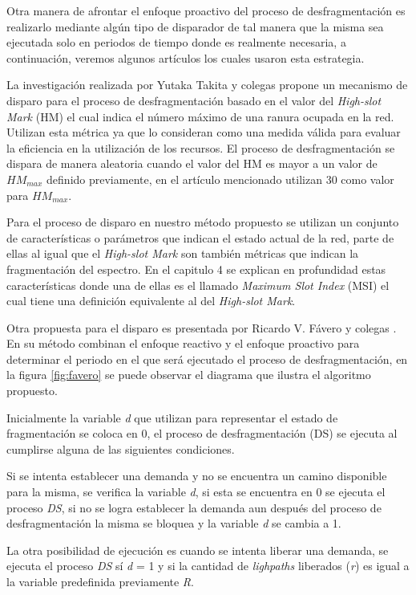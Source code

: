 Otra manera de afrontar el enfoque proactivo del proceso de desfragmentación es realizarlo mediante algún tipo de disparador de tal manera que la misma sea ejecutada solo en periodos de tiempo donde es realmente necesaria, a continuación, veremos algunos artículos los cuales usaron esta estrategia.

La investigación realizada por Yutaka Takita y colegas \cite{takita2016wavelength} propone un mecanismo de disparo para el proceso de desfragmentación basado en el valor del \textit{High-slot Mark} (HM) el cual indica el número máximo de una ranura ocupada en la red. Utilizan esta métrica ya que lo consideran como una medida válida para evaluar la eficiencia en la utilización de los recursos. El proceso de desfragmentación se dispara de manera aleatoria cuando el valor del HM es mayor a un valor de \( HM_{max} \) definido previamente, en el artículo mencionado utilizan 30 como valor para \( HM_{max} \). 

Para el proceso de disparo en nuestro método propuesto se utilizan un conjunto de características o parámetros que indican el estado actual de la red, parte de ellas al igual que el \textit{High-slot Mark} son también métricas que indican la fragmentación del espectro. En el capitulo 4 se explican en profundidad estas características donde una de ellas es el llamado \textit{Maximum Slot Index} (MSI) el cual tiene una definición equivalente al del \textit{High-slot Mark}. 

Otra propuesta para el disparo es presentada por Ricardo V. Fávero y colegas \cite{favero2015new}. En su método combinan el enfoque reactivo y el enfoque proactivo para determinar el periodo en el que será ejecutado el proceso de desfragmentación, en la figura \ref{fig:favero} se puede observar el diagrama que ilustra el algoritmo propuesto.

Inicialmente la variable \textit{d} que utilizan para representar el estado de fragmentación se coloca en 0, el proceso de desfragmentación (DS) se ejecuta al cumplirse alguna de las siguientes condiciones.

Si se intenta establecer una demanda y no se encuentra un camino disponible para la misma, se verifica la variable \textit{d}, si esta se encuentra en 0 se ejecuta el proceso \textit{DS}, si no se logra establecer la demanda aun después del proceso de desfragmentación la misma se bloquea y la variable \textit{d} se cambia a 1.

La otra posibilidad de ejecución es cuando se intenta liberar una demanda, se ejecuta el proceso \textit{DS} sí \textit{d} = 1 y si la cantidad de \textit{lighpaths} liberados (\textit{r}) es igual a la variable predefinida previamente \textit{R}. 


